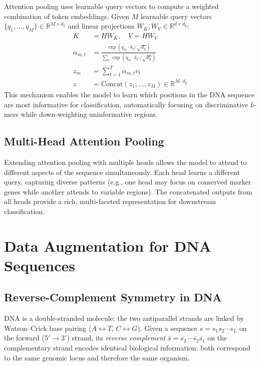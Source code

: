 Attention pooling uses learnable query vectors to compute a weighted combination of token embeddings. Given $M$ learnable query vectors $\{q_1, \ldots, q_M\} \in \mathbb{R}^{M \times d_q}$ and linear projections $W_K, W_V \in \mathbb{R}^{d \times d_q}$:
\begin{align}
    K &= H W_K, \quad V = H W_V \\
    \alpha_{m,t} &= \frac{\exp(q_m \cdot k_t / \sqrt{d_q})}{\sum_{t'} \exp(q_m \cdot k_{t'} / \sqrt{d_q})} \\
    z_m &= \sum_{t=1}^{T} \alpha_{m,t} v_t \\
    z &= \text{Concat}(z_1, \ldots, z_M) \in \mathbb{R}^{M \cdot d_q}
\end{align}
This mechanism enables the model to learn which positions in the DNA sequence are most informative for classification, automatically focusing on discriminative $k$-mers while down-weighting uninformative regions.

\subsection{Multi-Head Attention Pooling}

Extending attention pooling with multiple heads allows the model to attend to different aspects of the sequence simultaneously. Each head learns a different query, capturing diverse patterns (e.g., one head may focus on conserved marker genes while another attends to variable regions). The concatenated outputs from all heads provide a rich, multi-faceted representation for downstream classification.

\section{Data Augmentation for DNA Sequences}
\label{sec:bg-augmentation}

\subsection{Reverse-Complement Symmetry in DNA}
\label{sec:bg-rc-symmetry}

DNA is a double-stranded molecule: the two antiparallel strands are linked by Watson--Crick base pairing ($A \leftrightarrow T$, $C \leftrightarrow G$). Given a sequence $s = s_1 s_2 \cdots s_L$ on the forward (5$'$$\to$3$'$) strand, its \emph{reverse complement} $\bar{s} = \overline{s_L} \cdots \overline{s_2} \overline{s_1}$ on the complementary strand encodes identical biological information: both correspond to the same genomic locus and therefore the same organism.

